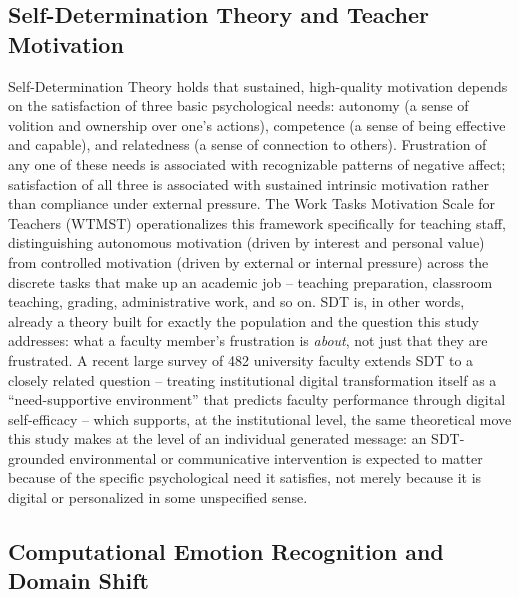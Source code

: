 \documentclass[higheredu,article,submit,pdftex,moreauthors]{Definitions/mdpi}
\begin{document}
\subsection{Self-Determination Theory and Teacher Motivation}

Self-Determination Theory \cite{deciryan2000} holds that sustained, high-quality motivation depends on the satisfaction of three basic psychological needs: autonomy (a sense of volition and ownership over one's actions), competence (a sense of being effective and capable), and relatedness (a sense of connection to others). Frustration of any one of these needs is associated with recognizable patterns of negative affect; satisfaction of all three is associated with sustained intrinsic motivation rather than compliance under external pressure. The Work Tasks Motivation Scale for Teachers (WTMST) \cite{fernet2008} operationalizes this framework specifically for teaching staff, distinguishing autonomous motivation (driven by interest and personal value) from controlled motivation (driven by external or internal pressure) across the discrete tasks that make up an academic job -- teaching preparation, classroom teaching, grading, administrative work, and so on. SDT is, in other words, already a theory built for exactly the population and the question this study addresses: what a faculty member's frustration is \emph{about}, not just that they are frustrated. A recent large survey of 482 university faculty \cite{sunyoon2025} extends SDT to a closely related question -- treating institutional digital transformation itself as a ``need-supportive environment'' that predicts faculty performance through digital self-efficacy -- which supports, at the institutional level, the same theoretical move this study makes at the level of an individual generated message: an SDT-grounded environmental or communicative intervention is expected to matter because of the specific psychological need it satisfies, not merely because it is digital or personalized in some unspecified sense.

\subsection{Computational Emotion Recognition and Domain Shift}
\end{document}
